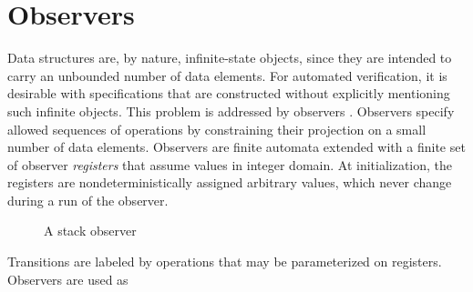 \section*{Observers}
\label{section:observers}
%
Data structures are, by nature, infinite-state objects, since they are intended to carry an unbounded number of data elements. For automated verification, it is desirable with specifications that are constructed without explicitly mentioning such infinite objects.  This problem is addressed by observers \cite{AHHR:integrated:rep}. Observers specify allowed sequences of operations by constraining their projection on a small number of data elements.
Observers are finite automata extended with a finite set of observer \emph{registers} that
assume values in integer domain. At initialization, the registers are nondeterministically assigned arbitrary
values, which never change during a run of the observer. 
\vspace{1cm}
\begin{figure}[h]
  \centering
  \vspace{0.3cm}
  \caption{A stack observer}
  \label{figure:shape:set:observers}
\end{figure} \vspace{1cm} Transitions are labeled
by operations that may be parameterized on registers. Observers are used as

